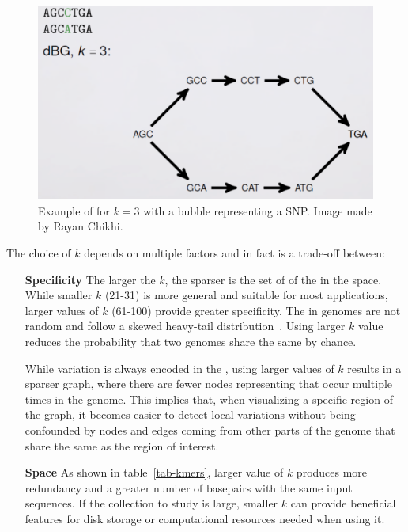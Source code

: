 \begin{figure}[h!]
	\centering
	\includegraphics[width=.95\linewidth]{figures/background/dbg.png}
	\caption[Example of \dbg.]{Example of \dbg for $k=3$ with a bubble representing a SNP. Image made by Rayan Chikhi.}
	\label{fig:dbg_ex}
\end{figure}
The choice of $k$ depends on multiple factors and in fact is a trade-off between: 
\begin{itemize}[leftmargin=1.8cm]
	\item[\textbf{Specificity}] The larger the $k$, the sparser is the set of \kmers of the \dbg in the space. While smaller $k$ (21-31) is more general and suitable for most applications, larger values of $k$ (61-100) provide greater specificity. The \kmers in genomes are not random and follow a skewed heavy-tail distribution~\cite{chor2009genomic}. Using larger $k$ value reduces the probability that two genomes share the same \kmer by chance.
	\item[\smash{\stackunder{\textbf{Variation}}{\textbf{resolution}}}]While variation is always encoded in the \dbg, using larger values of $k$ results in a sparser graph, where there are fewer nodes representing \kmers that occur multiple times in the genome. This implies that, when visualizing a specific region of the graph, it becomes easier to detect local variations without being confounded by nodes and edges coming from other parts of the genome that share the same \kmers as the region of interest.
	\item[\textbf{Space}] As shown in table~\ref{tab-kmers}, larger value of $k$ produces more redundancy and a greater number of basepairs with the same input sequences. If the collection to study is large, smaller $k$ can provide beneficial features for disk storage or computational resources needed when using it.
\end{itemize}
